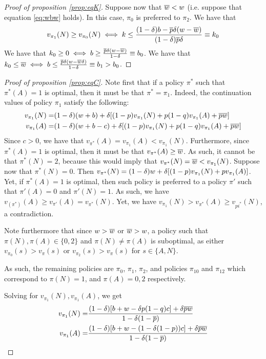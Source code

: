 {\begin{proof}[Proof of proposition \ref{prop:eqK}]
    Suppose now that $\overline{w} < w$ (i.e. suppose that equation \ref{eq:wbw} holds). In this case, $\pi_0$ is preferred to $\pi_2$. We have that 
    $$
    v_{\pi_1}(N) \geq v_{\pi_0}(N) \iff k \leq \frac{(1-\delta)b-\overline{p}\delta(w-\overline{w})}{(1-\delta)\overline{p}\delta} \equiv k_0
    $$
    We have that $k_0 \geq 0 \iff b \geq \frac{\overline{p}\delta(w-\overline{w})}{1-\delta} \equiv b_0$. We have that $k_0 \leq \overline{w} \iff b \leq \frac{\overline{p}\delta(w-\overline{w}\delta)}{1-\delta} \equiv b_1 > b_0$. 
\end{proof}

\begin{proof}[Proof of proposition \ref{prop:eqC}]
    Note first that if a policy $\pi^*$ such that $\pi^*(A) = 1$ is optimal, then it must be that $\pi^* = \pi_1$. Indeed, the continuation values of policy $\pi_1$ satisfy the following: 
    \begin{align*}
        v_{\pi_1}(N) =& (1-\delta) (w+b) + \delta [(1-p) v_{\pi_1}(N) + p(1-q) v_{\pi_1}(A) + \overline{p} \overline{w}] \\ 
        v_{\pi_1}(A) =& (1-\delta) (w+b-c) + \delta [(1-p) v_{\pi_1}(N) + p(1-q) v_{\pi_1}(A) + \overline{p} \overline{w}]
    \end{align*} 
    Since $c > 0$, we have that $v_{\pi^*}(A) = v_{\pi_1}(A) < v_{\pi_1}(N)$. Furthermore, since $\pi^*(A) = 1$ is optimal, then it must be that $v_{\pi^*}(A) \geq \overline{w}$. As such, it cannot be that $\pi^*(N) = 2$, because this would imply that $v_{\pi^*}(N) = \overline{w} < v_{\pi_1}(N)$. Suppose now that $\pi^*(N) = 0$. Then $v_{\pi^*}(N) = (1-\delta) w + \delta [(1-p) v_{\pi_1}(N) + p v_{\pi_1}(A)]$. Yet, if $\pi^*(A) = 1$ is optimal, then such policy is preferred to a policy $\pi'$ such that $\pi'(A) = 0$ and $\pi'(N) = 1$. As such, we have $v_(\pi^*)(A) \geq v_{\pi'}(A) = v_{\pi^*}(N)$. Yet, we have $v_{\pi_1}(N) > v_{\pi^*}(A) \geq v_{pi^*}(N)$, a contradiction. 

    Note furthermore that since $w > \overline{w}$ or $\overline{w} > w$, a policy such that $\pi(N), \pi(A) \in \{0,2\}$ and $\pi(N) \neq \pi(A)$ is suboptimal, as either $v_{\pi_0}(s) > v_\pi(s)$ or $v_{\pi_2}(s) > v_\pi(s)$ for $s \in \{A, N\}$. 

    As such, the remaining policies are $\pi_0$, $\pi_1$, $\pi_2$, and policies $\pi_{10}$ and $\pi_{12}$ which correspond to $\pi(N) = 1$, and $\pi(A) = 0, 2$ respectively.
    
    Solving for $v_{\pi_1}(N), v_{\pi_1}(A)$, we get
    \begin{align*}
        v_{\pi_1}(N) =& \frac{(1-\delta)[b+w-\delta p(1-q)c]+\delta\overline{p}\overline{w}}{1 - \delta(1-\overline{p})} \\ 
        v_{\pi_1}(A) =& \frac{(1-\delta)[b+w-(1-\delta(1-p))c]+\delta\overline{p}\overline{w}}{1 - \delta(1-\overline{p})}
    \end{align*}


\end{proof}}
